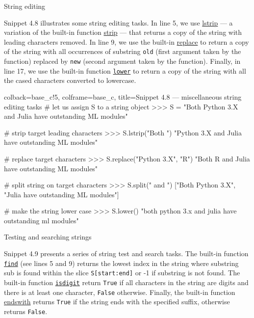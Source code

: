 \documentclass[a4paper,11pt]{book}
\numberwithin{figure}{chapter}
\numberwithin{table}{chapter}
\newcommand{\question}[1]{%
    \begin{tcolorbox}[colback=comp_c!10,colframe=comp_c,sidebyside align=top,width=\linewidth,before skip=1ex]
        #1
    \end{tcolorbox}%
    \switchcolumn%
}
\newcommand{\note}[1]{%
    \begin{tcolorbox}[colback=white!0,colframe=white!10,width=\linewidth,before skip=1ex]
        #1
    \end{tcolorbox}         
}
\begin{document}
\begin{paracol}{2}
	\question{\raggedright String editing}
	\note{Snippet 4.8 illustrates some string editing tasks. In line 5, we use \href{https://docs.python.org/3/library/stdtypes.html#str.format}{lstrip} --- a variation of the built-in function \href{https://docs.python.org/3/library/stdtypes.html#str.format}{strip} --- that returns a copy of the string with leading characters removed. In line 9, we use the built-in \href{https://docs.python.org/3/library/stdtypes.html}{replace} to return a copy of the string with all occurrences of substring \texttt{old} (first argument taken by the function) replaced by \texttt{new} (second argument taken by the function). Finally, in line 17, we use the built-in function \href{https://docs.python.org/3/library/stdtypes.html}{\texttt{lower}} to return a copy of the string with all the cased characters converted to lowercase.} 
\end{paracol}

\begin{pythoncode}[linenos=true,]{colback=base_c!5, colframe=base_c, title=\sffamily Snippet 4.8 --- miscellaneous string editing tasks}
# let us assign S to a string object
>>> S = "Both Python 3.X and Julia have outstanding ML modules"

# strip target leading characters
>>> S.lstrip("Both ")
"Python 3.X and Julia have outstanding ML modules"

# replace target characters
>>> S.replace("Python 3.X", "R")
"Both R and Julia have outstanding ML modules"

# split string on target characters
>>> S.split(" and ")
["Both Python 3.X", "Julia have outstanding ML modules"]

# make the string lower case
>>> S.lower() 
"both python 3.x and julia have outstanding ml modules"
\end{pythoncode}
\clearpage

\begin{paracol}{2}
\question{Testing and searching strings}
\note{Snippet 4.9 presents a series of string test and search tasks. The built-in function \href{https://docs.python.org/3/library/stdtypes.html}{\texttt{find}} (see lines 5 and 9) returns the lowest index in the string where substring sub is found within the slice \texttt{S[start:end]} or -1 if substring is not found.	The built-in function \href{https://docs.python.org/3/library/stdtypes.html}{\texttt{isdigit}} return \texttt{True} if all characters in the string are digits and there is at least one character, \texttt{False} otherwise. Finally, the built-in function \href{https://docs.python.org/3/library/stdtypes.html}{endswith} returns \texttt{True} if the string ends with the specified suffix, otherwise returns \texttt{False}.}
\end{paracol}
\end{document}
